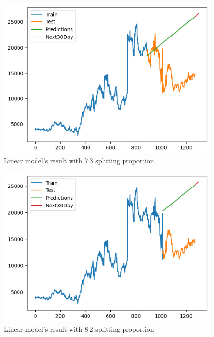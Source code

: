 \documentclass{ieeeojies}
\begin{document}
\begin{figure}[H]
  \centering
  \begin{minipage}{0.8\linewidth}
    \centering
    \includegraphics[width=\linewidth]{bibliography/Figure/LN_AMV73.png}
    \caption{Linear model's result with 7:3 splitting proportion}
    \label{fig8}
  \end{minipage}
\end{figure}

\begin{figure}[H]
  \centering
  \begin{minipage}{0.8\linewidth}
    \centering
    \includegraphics[width=\linewidth]{bibliography/Figure/LN_AMV82.png}
    \caption{Linear model's result with 8:2 splitting proportion}
    \label{fig8}
  \end{minipage}
\end{figure}
\end{document}

